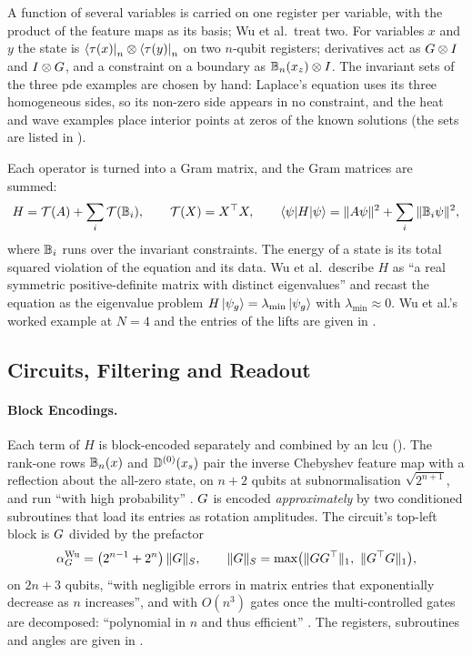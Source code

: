 A function of several variables is carried on one register per variable, with the product of the feature maps as its basis; Wu et al.\ treat two. For variables $x$ and $y$ the state is $\bra{\tau(x)}_n\otimes\bra{\tau(y)}_n$ on two $n$-qubit registers; derivatives act as $G\otimes I$ and $I\otimes G$, and a constraint on a boundary as $\mathbb{B}_n(x_z)\otimes I$. The invariant sets of the three \gls{pde} examples are chosen by hand: Laplace's equation uses its three homogeneous sides, so its non-zero side appears in no constraint, and the heat and wave examples place interior points at zeros of the known solutions (the sets are listed in ).

Each operator is turned into a Gram matrix, and the Gram matrices are summed:
\begin{equation}
    H=\mathcal{T}(A)+\sum_i\mathcal{T}(\mathbb{B}_i), \qquad \mathcal{T}(X)=X^{\top}X, \qquad \braket{\psi|H|\psi}=\|A\psi\|^2+\sum_i\|\mathbb{B}_i\psi\|^2,
    \label{eq:pihm-hamiltonian}
\end{equation}
where $\mathbb{B}_i$ runs over the invariant constraints. The energy of a state is its total squared violation of the equation and its data. Wu et al.\ describe $H$ as ``a real symmetric positive-definite matrix with distinct eigenvalues'' and recast the equation as the eigenvalue problem $H\ket{\psi_g}=\lambda_{\min}\ket{\psi_g}$ with $\lambda_{\min}\approx0$. Wu et al.'s worked example at $N=4$ and the entries of the lifts are given in .

\subsection{Circuits, Filtering and Readout}
\label{sec:pihm-encoding}

\paragraph{Block Encodings.} Each term of $H$ is block-encoded separately and combined by an \gls{lcu} (). The rank-one rows $\mathbb{B}_n(x)$ and $\mathbb{D}^{(0)}(x_s)$ pair the inverse Chebyshev feature map with a reflection about the all-zero state, on $n+2$ qubits at subnormalisation $\sqrt{2^{n+1}}$, and run ``with high probability'' \cite{wu2025pihm}. $G$ is encoded \emph{approximately} by two conditioned subroutines that load its entries as rotation amplitudes. The circuit's top-left block is $G$ divided by the prefactor
\begin{equation}
    \alpha_{G}^{\mathrm{Wu}}=\bigl(2^{n-1}+2^{n}\bigr)\,\|G\|_S, \qquad \|G\|_S=\max\bigl(\|GG^{\top}\|_1,\ \|G^{\top}G\|_1\bigr),
    \label{eq:pihm-published-prefactor}
\end{equation}
on $2n+3$ qubits, ``with negligible errors in matrix entries that exponentially decrease as $n$ increases'', and with $O(n^3)$ gates once the multi-controlled gates are decomposed: ``polynomial in $n$ and thus efficient'' \cite{wu2025pihm}. The registers, subroutines and angles are given in .

